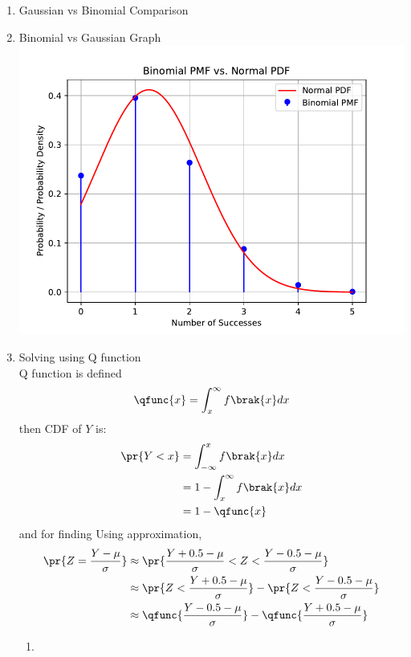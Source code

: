 \documentclass[journal,12pt,twocolumn]{IEEEtran}
\theoremstyle{remark}
\begin{document}
\begin{enumerate}[label=(\roman*)]
\begin{enumerate}[label=(\alph*)]
\end{enumerate}
\item Gaussian vs Binomial Comparison
\begin{table}[!ht]

\end{table}
\item Binomial vs Gaussian Graph\\
\includegraphics[width=\columnwidth]{./figs/plot.pdf}
\item Solving using Q function\\
Q function is defined
\begin{align}
	\qfunc{x}=\int_x^{\infty}f\brak{x}dx
\end{align}
then CDF of $Y$ is:
\begin{align}
	\pr{Y<x}&=\int_{-\infty}^x f\brak{x} dx\\
	&=1-\int_x^{\infty}f\brak{x}dx\\
	&=1-\qfunc{x}
\end{align}
and for finding  Using approximation,
\begin{align}
	\pr{Z=\frac{Y-\mu}{\sigma}} &\approx \pr{\frac{Y+0.5-\mu}{\sigma} < Z < \frac{Y-0.5-\mu}{\sigma}}\\
	&\approx \pr{Z<\frac{Y+0.5-\mu}{\sigma}} - \pr{Z<\frac{Y-0.5-\mu}{\sigma}}\\
	&\approx \qfunc{\frac{Y-0.5-\mu}{\sigma}} - \qfunc{\frac{Y+0.5-\mu}{\sigma}}
\end{align}
\begin{enumerate}
\item 
\begin{align}

\end{align}
\end{enumerate}
\end{enumerate}
\end{document}

